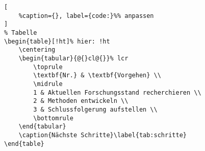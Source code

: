 \clearpage
\lstset{language=TeX}%
\begin{lstlisting}[
	%caption={}, label={code:}%% anpassen
]
% Tabelle
\begin{table}[!ht]% hier: !ht
	\centering
	\begin{tabular}{@{}cl@{}}% lcr
		\toprule
		\textbf{Nr.} & \textbf{Vorgehen} \\
		\midrule
		1 & Aktuellen Forschungsstand recherchieren \\
		2 & Methoden entwickeln \\
		3 & Schlussfolgerung aufstellen \\
		\bottomrule
	\end{tabular}
	\caption{Nächste Schritte}\label{tab:schritte}
\end{table}
\end{lstlisting}